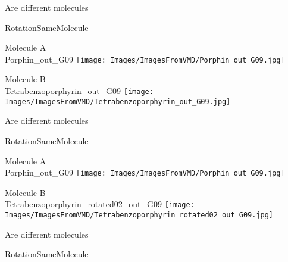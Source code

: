 \begin{center}
\vtab
\vtab
\textcolor{NavyBlue}{\large Are different molecules}
\end{center}
\newpage
{\Large RotationSameMolecule}
\begin{multicols}{2}
\begin{center}
Molecule A \\ 
Porphin\_out\_G09
\texttt{[image: Images/ImagesFromVMD/Porphin\_out\_G09.jpg]}
\vtab

\columnbreak

Molecule B \\ 
Tetrabenzoporphyrin\_out\_G09
\texttt{[image: Images/ImagesFromVMD/Tetrabenzoporphyrin\_out\_G09.jpg]}
\vtab
\end{center}
\end{multicols}
\begin{center}
\vtab
\vtab
\textcolor{NavyBlue}{\large Are different molecules}
\end{center}
\newpage
{\Large RotationSameMolecule}
\begin{multicols}{2}
\begin{center}
Molecule A \\ 
Porphin\_out\_G09
\texttt{[image: Images/ImagesFromVMD/Porphin\_out\_G09.jpg]}
\vtab

\columnbreak

Molecule B \\ 
Tetrabenzoporphyrin\_rotated02\_out\_G09
\texttt{[image: Images/ImagesFromVMD/Tetrabenzoporphyrin\_rotated02\_out\_G09.jpg]}
\vtab
\end{center}
\end{multicols}
\begin{center}
\vtab
\vtab
\textcolor{NavyBlue}{\large Are different molecules}
\end{center}
\newpage
{\Large RotationSameMolecule}
